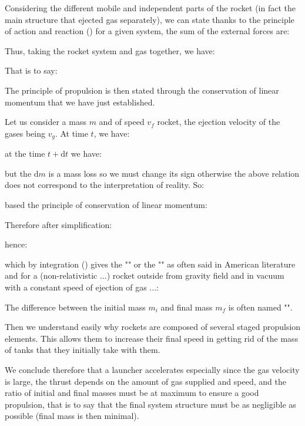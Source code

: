 	Considering the different mobile and independent parts of the rocket (in fact the main structure that ejected gas separately), we can state thanks to the principle of action and reaction () for a given system, the sum of the external forces are:
	
	Thus, taking the rocket system and gas together, we have:
	
	That is to say:
	
	The principle of propulsion is then stated through the conservation of linear momentum that we have just established.
	
	Let us consider a mass $m$ and of speed $v_f$ rocket, the ejection velocity of the gases being $v_g$. At time $t$, we have:
	
	at the time $t+\mathrm{d}t$ we have:
	
	but the $\mathrm{d}m$ is a mass loss so we must change its sign otherwise the above relation does not correspond to the interpretation of reality. So:
	
	based the principle of conservation of linear momentum:
	
	Therefore after simplification:
	
	hence:
	
	which by integration () gives the "" or the "" as often said in American literature and for a (non-relativistic ...) rocket outside from gravity field and in vacuum with a constant speed  of ejection of gas ...:
	
	The difference between the initial mass $m_i$ and final mass $m_f$ is often named "".
	
	Then we understand easily why rockets are composed of several staged propulsion elements. This allows them to increase their final speed in getting rid of the mass of tanks that they initially take with them.

	We conclude therefore that a launcher accelerates especially since the gas velocity is large, the thrust depends on the amount of gas supplied and speed, and the ratio of initial and final masses must be at maximum to ensure a good propulsion, that is to say that the final system structure must be as negligible as possible (final mass is then minimal).
	
